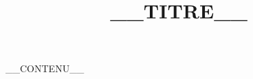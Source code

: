 \documentclass[a4paper,10pt]{article}
\title{__TITRE__}
\author{\eDevoir}
\begin{document}
\maketitle
__CONTENU__
\end{document}
